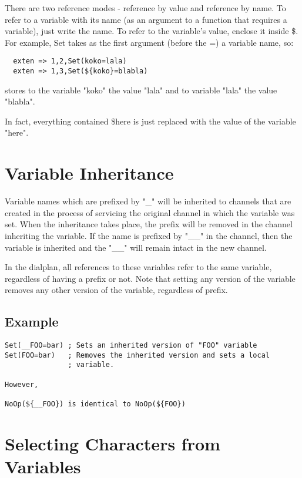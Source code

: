 There are two reference modes - reference by value and reference by name. 
To refer to a variable with its name (as an argument to a function that 
requires a variable), just write the name. To refer to the variable's value, 
enclose it inside \${}. For example, Set takes as the first argument 
(before the =) a variable name, so: 
\begin{verbatim}
  exten => 1,2,Set(koko=lala)
  exten => 1,3,Set(${koko}=blabla)
\end{verbatim}
stores to the variable "koko" the value "lala" and to variable "lala" the 
value "blabla". 

In fact, everything contained \${here} is just replaced with the value of 
the variable "here". 

\section{Variable Inheritance}

Variable names which are prefixed by "\_" will be inherited to channels 
that are created in the process of servicing the original channel in 
which the variable was set.  When the inheritance takes place, the 
prefix will be removed in the channel inheriting the variable.  If the 
name is prefixed by "\_\_" in the channel, then the variable is 
inherited and the "\_\_" will remain intact in the new channel.

In the dialplan, all references to these variables refer to the same 
variable, regardless of having a prefix or not.  Note that setting any 
version of the variable removes any other version of the variable, 
regardless of prefix.

\subsection{Example}
\begin{verbatim}
Set(__FOO=bar) ; Sets an inherited version of "FOO" variable 
Set(FOO=bar)   ; Removes the inherited version and sets a local 
               ; variable.

However,

NoOp(${__FOO}) is identical to NoOp(${FOO})
\end{verbatim}


\section{Selecting Characters from Variables}

